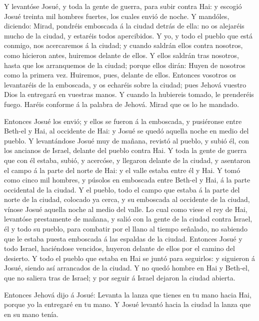  Y levantóse Josué, y toda la gente de guerra, para subir
contra Hai: y escogió Josué treinta mil hombres fuertes, los cuales
envió de noche.  Y mandóles, diciendo: Mirad, pondréis
emboscada á la ciudad detrás de ella: no os alejaréis mucho de la
ciudad, y estaréis todos apercibidos.  Y yo, y todo el
pueblo que está conmigo, nos acercaremos á la ciudad; y cuando saldrán
ellos contra nosotros, como hicieron antes, huiremos delante de ellos.
 Y ellos saldrán tras nosotros, hasta que los arranquemos de
la ciudad; porque ellos dirán: Huyen de nosotros como la primera vez.
Huiremos, pues, delante de ellos.  Entonces vosotros os
levantaréis de la emboscada, y os echaréis sobre la ciudad; pues Jehová
vuestro Dios la entregará en vuestras manos.  Y cuando la
hubiereis tomado, le prenderéis fuego. Haréis conforme á la palabra de
Jehová. Mirad que os lo he mandado.

 Entonces Josué los envió; y ellos se fueron á la emboscada,
y pusiéronse entre Beth-el y Hai, al occidente de Hai: y Josué se quedó
aquella noche en medio del pueblo.  Y levantándose Josué
muy de mañana, revistó al pueblo, y subió él, con los ancianos de
Israel, delante del pueblo contra Hai.  Y toda la gente de
guerra que con él estaba, subió, y acercóse, y llegaron delante de la
ciudad, y asentaron el campo á la parte del norte de Hai: y el valle
estaba entre él y Hai.  Y tomó como cinco mil hombres, y
púsolos en emboscada entre Beth-el y Hai, á la parte occidental de la
ciudad.  Y el pueblo, todo el campo que estaba á la parte
del norte de la ciudad, colocado ya cerca, y su emboscada al occidente
de la ciudad, vínose Josué aquella noche al medio del valle.
 Lo cual como viese el rey de Hai, levantóse prestamente de
mañana, y salió con la gente de la ciudad contra Israel, él y todo su
pueblo, para combatir por el llano al tiempo señalado, no sabiendo que
le estaba puesta emboscada á las espaldas de la ciudad. 
Entonces Josué y todo Israel, haciéndose vencidos, huyeron delante de
ellos por el camino del desierto.  Y todo el pueblo que
estaba en Hai se juntó para seguirlos: y siguieron á Josué, siendo así
arrancados de la ciudad.  Y no quedó hombre en Hai y
Beth-el, que no saliera tras de Israel; y por seguir á Israel dejaron la
ciudad abierta.

 Entonces Jehová dijo á Josué: Levanta la lanza que tienes
en tu mano hacia Hai, porque yo la entregaré en tu mano. Y Josué levantó
hacia la ciudad la lanza que en su mano tenía.

